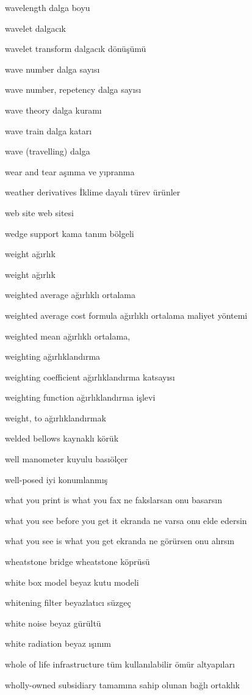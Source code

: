\documentclass[12pt,fleqn]{article}\usepackage{../../common}
\begin{document}
wavelength dalga boyu

wavelet dalgacık

wavelet transform dalgacık dönüşümü

wave number dalga sayısı

wave number, repetency dalga sayısı

wave theory dalga kuramı

wave train dalga katarı

wave (travelling) dalga

wear and tear aşınma ve yıpranma

weather derivatives İklime dayalı türev ürünler

web site web sitesi

wedge support kama tanım bölgeli

weight ağırlık

weight ağırlık

weighted average ağırlıklı ortalama

weighted average cost formula ağırlıklı ortalama maliyet yöntemi

weighted mean ağırlıklı ortalama,

weighting ağırlıklandırma

weighting coefficient ağırlıklandırma katsayısı

weighting function ağırlıklandırma işlevi

weight, to ağırlıklandırmak

welded bellows kaynaklı körük

well manometer kuyulu basıölçer

well-posed iyi konumlanmış

what you print is what you fax ne fakslarsan onu basarsın

what you see before you get it ekranda ne varsa onu elde edersin

what you see is what you get ekranda ne görürsen onu alırsın

wheatstone bridge wheatstone köprüsü

white box model beyaz kutu modeli

whitening filter beyazlatıcı süzgeç

white noise beyaz gürültü

white radiation beyaz ışınım

whole of life infrastructure tüm kullanılabilir ömür altyapıları

wholly-owned subsidiary tamamına sahip olunan bağlı ortaklık
\end{document}
